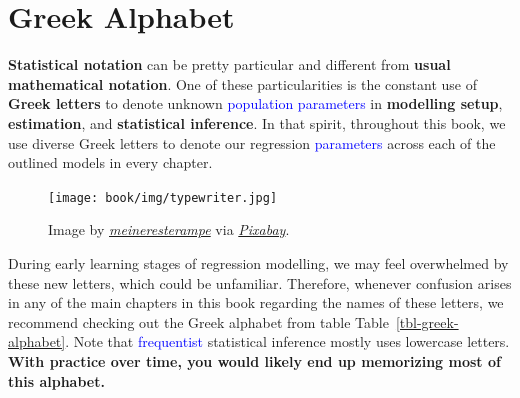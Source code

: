 \documentclass[
  letterpaper,
  DIV=11,
  numbers=noendperiod]{scrreprt}
\begin{document}
\chapter{Greek Alphabet}\label{sec-greek-alphabet}

\textbf{Statistical notation} can be pretty particular and different
from \textbf{usual mathematical notation}. One of these particularities
is the constant use of \textbf{Greek letters} to denote unknown
\textcolor{blue}{population parameters} in \textbf{modelling setup},
\textbf{estimation}, and \textbf{statistical inference}. In that spirit,
throughout this book, we use diverse Greek letters to denote our
regression \textcolor{blue}{parameters} across each of the outlined
models in every chapter.

\begin{figure}[H]

{\centering \texttt{[image: book/img/typewriter.jpg]}

}

\caption{Image by
\href{https://pixabay.com/users/meineresterampe-26089/}{\emph{meineresterampe}}
via
\href{https://pixabay.com/photos/typewriter-old-retro-office-1899760/}{\emph{Pixabay}}.}

\end{figure}%

During early learning stages of regression modelling, we may feel
overwhelmed by these new letters, which could be unfamiliar. Therefore,
whenever confusion arises in any of the main chapters in this book
regarding the names of these letters, we recommend checking out the
Greek alphabet from table Table~\ref{tbl-greek-alphabet}. Note that
\textcolor{blue}{frequentist} statistical inference mostly uses
lowercase letters. \textbf{With practice over time, you would likely end
up memorizing most of this alphabet.}
\end{document}
